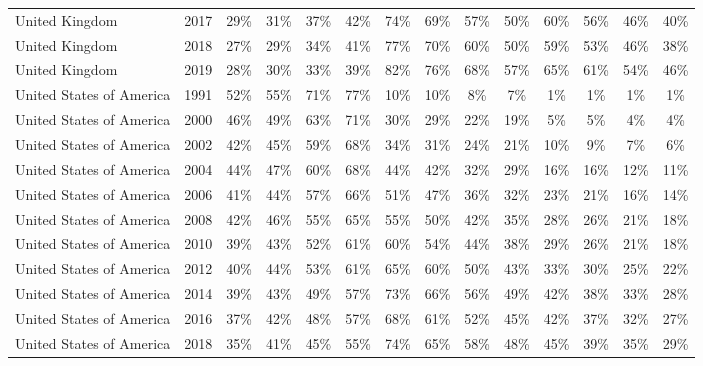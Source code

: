 \begin{ThreePartTable}
\begin{longtable}[t]{lccccccccccccc}
United Kingdom & 2017 & 29\% & 31\% & 37\% & 42\% & 74\% & 69\% & 57\% & 50\% & 60\% & 56\% & 46\% & 40\%\\
United Kingdom & 2018 & 27\% & 29\% & 34\% & 41\% & 77\% & 70\% & 60\% & 50\% & 59\% & 53\% & 46\% & 38\%\\
United Kingdom & 2019 & 28\% & 30\% & 33\% & 39\% & 82\% & 76\% & 68\% & 57\% & 65\% & 61\% & 54\% & 46\%\\
\addlinespace
United States of America & 1991 & 52\% & 55\% & 71\% & 77\% & 10\% & 10\% & 8\% & 7\% & 1\% & 1\% & 1\% & 1\%\\
United States of America & 2000 & 46\% & 49\% & 63\% & 71\% & 30\% & 29\% & 22\% & 19\% & 5\% & 5\% & 4\% & 4\%\\
United States of America & 2002 & 42\% & 45\% & 59\% & 68\% & 34\% & 31\% & 24\% & 21\% & 10\% & 9\% & 7\% & 6\%\\
United States of America & 2004 & 44\% & 47\% & 60\% & 68\% & 44\% & 42\% & 32\% & 29\% & 16\% & 16\% & 12\% & 11\%\\
United States of America & 2006 & 41\% & 44\% & 57\% & 66\% & 51\% & 47\% & 36\% & 32\% & 23\% & 21\% & 16\% & 14\%\\
United States of America & 2008 & 42\% & 46\% & 55\% & 65\% & 55\% & 50\% & 42\% & 35\% & 28\% & 26\% & 21\% & 18\%\\
United States of America & 2010 & 39\% & 43\% & 52\% & 61\% & 60\% & 54\% & 44\% & 38\% & 29\% & 26\% & 21\% & 18\%\\
United States of America & 2012 & 40\% & 44\% & 53\% & 61\% & 65\% & 60\% & 50\% & 43\% & 33\% & 30\% & 25\% & 22\%\\
United States of America & 2014 & 39\% & 43\% & 49\% & 57\% & 73\% & 66\% & 56\% & 49\% & 42\% & 38\% & 33\% & 28\%\\
United States of America & 2016 & 37\% & 42\% & 48\% & 57\% & 68\% & 61\% & 52\% & 45\% & 42\% & 37\% & 32\% & 27\%\\
United States of America & 2018 & 35\% & 41\% & 45\% & 55\% & 74\% & 65\% & 58\% & 48\% & 45\% & 39\% & 35\% & 29\%\\*
\end{longtable}
\end{ThreePartTable}
\endgroup{}
